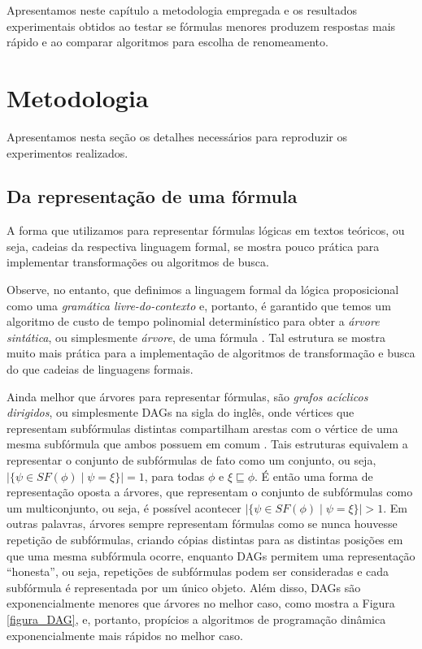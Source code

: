 
\label{cap_resultados}

\indent

Apresentamos neste capítulo a metodologia empregada e os resultados experimentais obtidos ao testar se fórmulas menores produzem respostas mais rápido e ao comparar algoritmos para escolha de renomeamento.

\section{Metodologia}

\indent

Apresentamos nesta seção os detalhes necessários para reproduzir os experimentos realizados.

\subsection{Da representação de uma fórmula}

\indent

A forma que utilizamos para representar fórmulas lógicas em textos teóricos, ou seja, cadeias da respectiva linguagem formal, se mostra pouco prática para implementar transformações ou algoritmos de busca.

Observe, no entanto, que definimos a linguagem formal da lógica proposicional como uma \emph{gramática livre-do-contexto} \cite{sipser2012introduction} e, portanto, é garantido que temos um algoritmo de custo de tempo polinomial determinístico para obter a \emph{árvore sintática}, ou simplesmente \emph{árvore}, de uma fórmula \cite{younger1967recognition}. Tal estrutura se mostra muito mais prática para a implementação de algoritmos de transformação e busca do que cadeias de linguagens formais.

Ainda melhor que árvores para representar fórmulas, são \emph{grafos acíclicos dirigidos}, ou simplesmente DAGs na sigla do inglês, onde vértices que representam subfórmulas distintas compartilham arestas com o vértice de uma mesma subfórmula que ambos possuem em comum \cite{jackson2004clause}. Tais estruturas equivalem a representar o conjunto de subfórmulas de fato como um conjunto, ou seja, $|\{\psi \in SF(\phi) \mid \psi = \xi \}| = 1$, para todas $\phi$ e $\xi \sqsubseteq \phi$. É então uma forma de representação oposta a árvores, que representam o conjunto de subfórmulas como um multiconjunto, ou seja, é possível acontecer $|\{\psi \in SF(\phi) \mid \psi = \xi \}| > 1$. Em outras palavras, árvores sempre representam fórmulas como se nunca houvesse repetição de subfórmulas, criando cópias distintas para as distintas posições em que uma mesma subfórmula ocorre, enquanto DAGs permitem uma representação ``honesta'', ou seja, repetições de subfórmulas podem ser consideradas e cada subfórmula é representada por um único objeto. Além disso, DAGs são exponencialmente menores que árvores no melhor caso, como mostra a Figura \ref{figura_DAG}, e, portanto, propícios a algoritmos de programação dinâmica exponencialmente mais rápidos no melhor caso.

